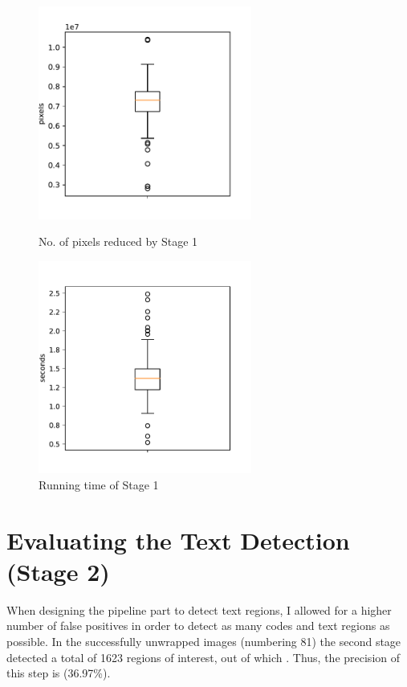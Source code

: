 \begin{figure}
    \centering
    \begin{minipage}[c]{0.5\linewidth}
        \centering
        \includegraphics[height=7cm, keepaspectratio]{img/evaluation/no_of_pixels_reduced-stage1.pdf}
            \caption{No. of pixels reduced by Stage 1}
            \label{fig:pixel_count_reduced-stage1}
    \end{minipage}\hfill
    \begin{minipage}[c]{0.5\linewidth}
        \centering
        \includegraphics[height=7cm, keepaspectratio]{img/evaluation/running_time-stage1.pdf}
            \caption{Running time of Stage 1}
            \label{fig:running_time-stage1}
    \end{minipage}
\end{figure}

\section{Evaluating the Text Detection (Stage 2)}\label{section:evaluation-text_detection}

When designing the pipeline part to detect text regions, I allowed for a higher number of false positives in order to detect as many codes and text regions as possible. In the successfully unwrapped images (numbering 81) the second stage detected a total of 1623 regions of interest, out of which . Thus, the precision of this step is (36.97\%).

